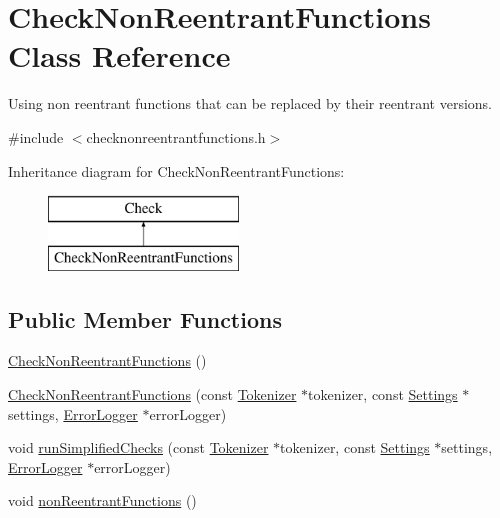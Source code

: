 \hypertarget{class_check_non_reentrant_functions}{\section{Check\-Non\-Reentrant\-Functions Class Reference}
\label{class_check_non_reentrant_functions}
}


Using non reentrant functions that can be replaced by their reentrant versions.  




{\ttfamily \#include $<$checknonreentrantfunctions.\-h$>$}

Inheritance diagram for Check\-Non\-Reentrant\-Functions\-:\begin{figure}[H]
\begin{center}
\leavevmode
\includegraphics[height=2.000000cm]{class_check_non_reentrant_functions}
\end{center}
\end{figure}
\subsection*{Public Member Functions}
\begin{DoxyCompactItemize}
\item 
\hyperlink{class_check_non_reentrant_functions_aa346bb1605b894af456a9fa579c89425}{Check\-Non\-Reentrant\-Functions} ()
\item 
\hyperlink{class_check_non_reentrant_functions_af6ec65541e2abe1368d542c32a6223fc}{Check\-Non\-Reentrant\-Functions} (const \hyperlink{class_tokenizer}{Tokenizer} $\ast$tokenizer, const \hyperlink{class_settings}{Settings} $\ast$settings, \hyperlink{class_error_logger}{Error\-Logger} $\ast$error\-Logger)
\item 
void \hyperlink{class_check_non_reentrant_functions_ad91d354ea4c40f49e57f6c6b2f255f17}{run\-Simplified\-Checks} (const \hyperlink{class_tokenizer}{Tokenizer} $\ast$tokenizer, const \hyperlink{class_settings}{Settings} $\ast$settings, \hyperlink{class_error_logger}{Error\-Logger} $\ast$error\-Logger)
\item 
void \hyperlink{class_check_non_reentrant_functions_ae9d16a157707ae7f4ed1d7c1b7220b1e}{non\-Reentrant\-Functions} ()
\end{DoxyCompactItemize}
